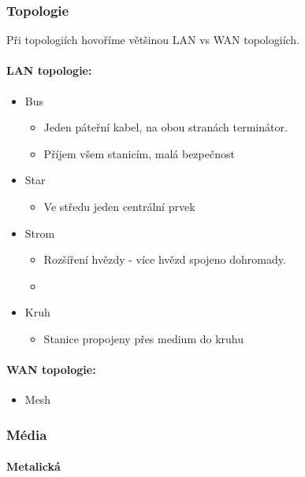 \documentclass[10pt,a4paper]{article}
\begin{document}
\subsubsection{Topologie}
Při topologiích hovoříme většinou LAN vs WAN topologiích.
\paragraph{LAN topologie:}
\begin{itemize}
\item Bus
\begin{itemize}
\item Jeden páteřní kabel, na obou stranách terminátor.
\item Příjem všem stanicím, malá bezpečnost
\end{itemize}
\item Star
\begin{itemize}
\item Ve středu jeden centrální prvek
\end{itemize}
\item Strom
\begin{itemize}
\item Rozšíření hvězdy - více hvězd spojeno dohromady.
\item 
\end{itemize}
\item Kruh
\begin{itemize}
\item Stanice propojeny přes medium do kruhu
\end{itemize}
\end{itemize}

\paragraph{WAN topologie:}

\begin{itemize}
\item Mesh 
\end{itemize}
 
\subsubsection{Média}
\paragraph{Metalická}
\end{document}
